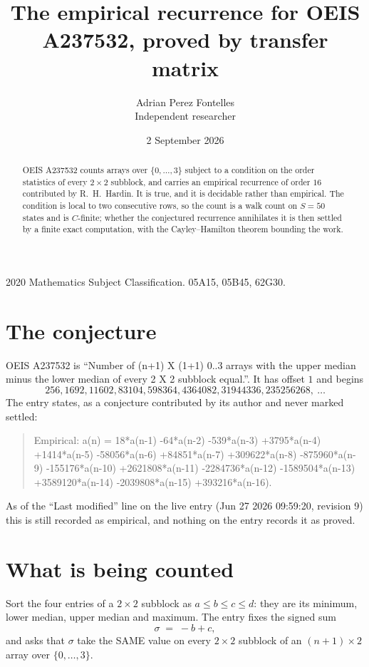 \documentclass[11pt,a4paper]{article}
\title{The empirical recurrence for OEIS A237532, proved by transfer matrix}
\author{Adrian Perez Fontelles\\ \small Independent researcher}
\date{2 September 2026}
\theoremstyle{plain}
\theoremstyle{definition}
\begin{document}
\maketitle

\begin{abstract}
OEIS A237532 counts arrays over $\{0,\dots,3\}$ subject to a condition on the order
statistics of every $2\times2$ subblock, and carries an empirical recurrence of order
$16$ contributed by R.~H.~Hardin. It is true, and it is decidable rather than empirical.
The condition is local to two consecutive rows, so the count is a walk count on $S=50$
states and is $C$-finite; whether the conjectured recurrence annihilates it is then settled by
a finite exact computation, with the Cayley--Hamilton theorem bounding the work.
\end{abstract}

\noindent\small 2020 Mathematics Subject Classification. 05A15, 05B45, 62G30.\normalsize

\section{The conjecture}

OEIS A237532 is ``Number of (n+1) X (1+1) 0..3 arrays with the upper median minus the lower median of every 2 X 2 subblock equal.''. It has offset $1$ and begins
\[
256, 1692, 11602, 83104, 598364, 4364082, 31944336, 235256268,\ \dots
\]
The entry states, as a conjecture contributed by its author and never marked settled:
\begin{quote}
Empirical: a(n) = 18*a(n-1) -64*a(n-2) -539*a(n-3) +3795*a(n-4) +1414*a(n-5) -58056*a(n-6) +84851*a(n-7) +309622*a(n-8) -875960*a(n-9) -155176*a(n-10) +2621808*a(n-11) -2284736*a(n-12) -1589504*a(n-13) +3589120*a(n-14) -2039808*a(n-15) +393216*a(n-16).
\end{quote}
As of the ``Last modified'' line on the live entry (Jun 27 2026 09:59:20, revision 9) this is still
recorded as empirical, and nothing on the entry records it as proved.

\section{What is being counted}

Sort the four entries of a $2\times2$ subblock as $a\le b\le c\le d$: they
are its minimum, lower median, upper median and maximum. The entry fixes the signed sum
\[
\sigma\;=\;-b+c,
\]
and asks that $\sigma$ take the SAME value on every $2\times2$ subblock of an
$(n+1)\times2$ array over $\{0,\dots,3\}$.
\end{document}
